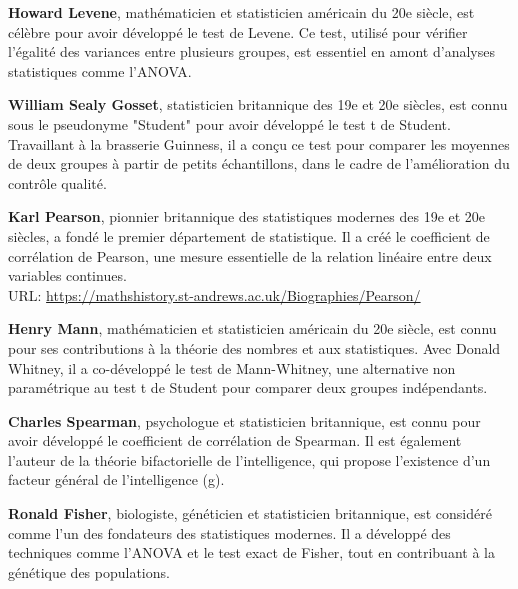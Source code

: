 \begin{thebibliography}{9}
\textbf{Howard Levene}, mathématicien et statisticien américain du 20e siècle, est célèbre pour avoir développé le test de Levene. Ce test, utilisé pour vérifier l'égalité des variances entre plusieurs groupes, est essentiel en amont d'analyses statistiques comme l'ANOVA.

\textbf{William Sealy Gosset}, statisticien britannique des 19e et 20e siècles, est connu sous le pseudonyme "Student" pour avoir développé le test t de Student. Travaillant à la brasserie Guinness, il a conçu ce test pour comparer les moyennes de deux groupes à partir de petits échantillons, dans le cadre de l'amélioration du contrôle qualité. 

\textbf{Karl Pearson}, pionnier britannique des statistiques modernes des 19e et 20e siècles, a fondé le premier département de statistique. Il a créé le coefficient de corrélation de Pearson, une mesure essentielle de la relation linéaire entre deux variables continues.\\ 
URL: \url{https://mathshistory.st-andrews.ac.uk/Biographies/Pearson/}

\textbf{Henry Mann}, mathématicien et statisticien américain du 20e siècle, est connu pour ses contributions à la théorie des nombres et aux statistiques. Avec Donald Whitney, il a co-développé le test de Mann-Whitney, une alternative non paramétrique au test t de Student pour comparer deux groupes indépendants.

\textbf{Charles Spearman}, psychologue et statisticien britannique, est connu pour avoir développé le coefficient de corrélation de Spearman. Il est également l’auteur de la théorie bifactorielle de l'intelligence, qui propose l’existence d’un facteur général de l'intelligence (g).

\textbf{Ronald Fisher}, biologiste, généticien et statisticien britannique, est considéré comme l'un des fondateurs des statistiques modernes. Il a développé des techniques comme l'ANOVA et le test exact de Fisher, tout en contribuant à la génétique des populations.

\end{thebibliography} 

